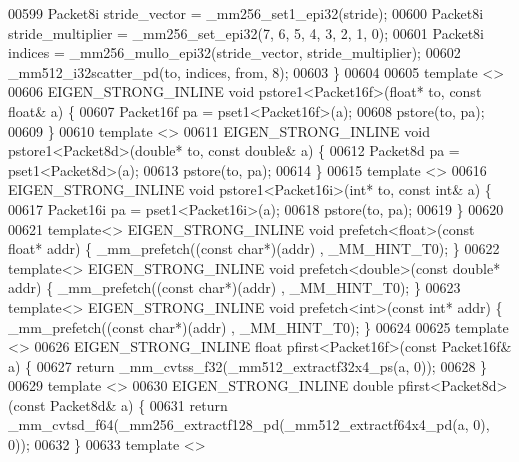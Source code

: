 \begin{DoxyCode}
00599   Packet8i stride\_vector = \_mm256\_set1\_epi32(stride);
00600   Packet8i stride\_multiplier = \_mm256\_set\_epi32(7, 6, 5, 4, 3, 2, 1, 0);
00601   Packet8i indices = \_mm256\_mullo\_epi32(stride\_vector, stride\_multiplier);
00602   \_mm512\_i32scatter\_pd(to, indices, from, 8);
00603 \}
00604 
00605 \textcolor{keyword}{template} <>
00606 EIGEN\_STRONG\_INLINE \textcolor{keywordtype}{void} pstore1<Packet16f>(\textcolor{keywordtype}{float}* to, \textcolor{keyword}{const} \textcolor{keywordtype}{float}& a) \{
00607   Packet16f pa = pset1<Packet16f>(a);
00608   pstore(to, pa);
00609 \}
00610 \textcolor{keyword}{template} <>
00611 EIGEN\_STRONG\_INLINE \textcolor{keywordtype}{void} pstore1<Packet8d>(\textcolor{keywordtype}{double}* to, \textcolor{keyword}{const} \textcolor{keywordtype}{double}& a) \{
00612   Packet8d pa = pset1<Packet8d>(a);
00613   pstore(to, pa);
00614 \}
00615 \textcolor{keyword}{template} <>
00616 EIGEN\_STRONG\_INLINE \textcolor{keywordtype}{void} pstore1<Packet16i>(\textcolor{keywordtype}{int}* to, \textcolor{keyword}{const} \textcolor{keywordtype}{int}& a) \{
00617   Packet16i pa = pset1<Packet16i>(a);
00618   pstore(to, pa);
00619 \}
00620 
00621 \textcolor{keyword}{template}<> EIGEN\_STRONG\_INLINE \textcolor{keywordtype}{void} prefetch<float>(\textcolor{keyword}{const} \textcolor{keywordtype}{float}*   addr) \{ \_mm\_prefetch((\textcolor{keyword}{const} \textcolor{keywordtype}{char}*)(addr)
      , \_MM\_HINT\_T0); \}
00622 \textcolor{keyword}{template}<> EIGEN\_STRONG\_INLINE \textcolor{keywordtype}{void} prefetch<double>(\textcolor{keyword}{const} \textcolor{keywordtype}{double}* addr) \{ \_mm\_prefetch((\textcolor{keyword}{const} \textcolor{keywordtype}{char}*)(addr)
      , \_MM\_HINT\_T0); \}
00623 \textcolor{keyword}{template}<> EIGEN\_STRONG\_INLINE \textcolor{keywordtype}{void} prefetch<int>(\textcolor{keyword}{const} \textcolor{keywordtype}{int}*       addr) \{ \_mm\_prefetch((\textcolor{keyword}{const} \textcolor{keywordtype}{char}*)(addr)
      , \_MM\_HINT\_T0); \}
00624 
00625 \textcolor{keyword}{template} <>
00626 EIGEN\_STRONG\_INLINE \textcolor{keywordtype}{float} pfirst<Packet16f>(\textcolor{keyword}{const} Packet16f& a) \{
00627   \textcolor{keywordflow}{return} \_mm\_cvtss\_f32(\_mm512\_extractf32x4\_ps(a, 0));
00628 \}
00629 \textcolor{keyword}{template} <>
00630 EIGEN\_STRONG\_INLINE \textcolor{keywordtype}{double} pfirst<Packet8d>(\textcolor{keyword}{const} Packet8d& a) \{
00631   \textcolor{keywordflow}{return} \_mm\_cvtsd\_f64(\_mm256\_extractf128\_pd(\_mm512\_extractf64x4\_pd(a, 0), 0));
00632 \}
00633 \textcolor{keyword}{template} <>

\end{DoxyCode}
